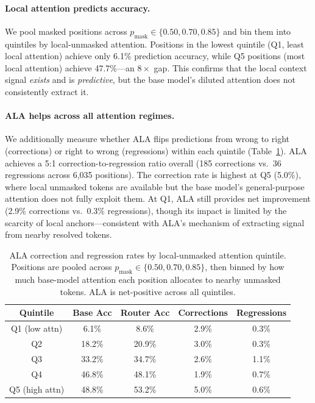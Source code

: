 \documentclass{article} %
\newcommand{\pmask}{p_{\text{mask}}}
\begin{document}
\paragraph{Local attention predicts accuracy.}
We pool masked positions across $\pmask \in \{0.50, 0.70, 0.85\}$ and bin them into quintiles by local-unmasked attention.
Positions in the lowest quintile (Q1, least local attention) achieve only 6.1\% prediction accuracy, while Q5 positions (most local attention) achieve 47.7\%---an $8\times$ gap.
This confirms that the local context signal \emph{exists} and is \emph{predictive}, but the base model's diluted attention does not consistently extract it.

\paragraph{ALA helps across all attention regimes.}
We additionally measure whether ALA flips predictions from wrong to right (corrections) or right to wrong (regressions) within each quintile (Table~\ref{tab:ala_correction}).
ALA achieves a 5:1 correction-to-regression ratio overall (185 corrections vs.\ 36 regressions across 6,035 positions).
The correction rate is highest at Q5 (5.0\%), where local unmasked tokens are available but the base model's general-purpose attention does not fully exploit them.
At Q1, ALA still provides net improvement (2.9\% corrections vs.\ 0.3\% regressions), though its impact is limited by the scarcity of local anchors---consistent with ALA's mechanism of extracting signal from nearby resolved tokens.

\begin{table}[t]
\begin{center}
\begin{tabular}{ccccc}
\toprule
Quintile & Base Acc & Router Acc & Corrections & Regressions \\
\midrule
Q1 (low attn) & 6.1\% & 8.6\% & 2.9\% & 0.3\% \\
Q2 & 18.2\% & 20.9\% & 3.0\% & 0.3\% \\
Q3 & 33.2\% & 34.7\% & 2.6\% & 1.1\% \\
Q4 & 46.8\% & 48.1\% & 1.9\% & 0.7\% \\
Q5 (high attn) & 48.8\% & 53.2\% & 5.0\% & 0.6\% \\
\bottomrule
\end{tabular}
\end{center}
\caption{ALA correction and regression rates by local-unmasked attention quintile. Positions are pooled across $\pmask \in \{0.50, 0.70, 0.85\}$, then binned by how much base-model attention each position allocates to nearby unmasked tokens. ALA is net-positive across all quintiles.}\label{tab:ala_correction}
\end{table}
\end{document}
